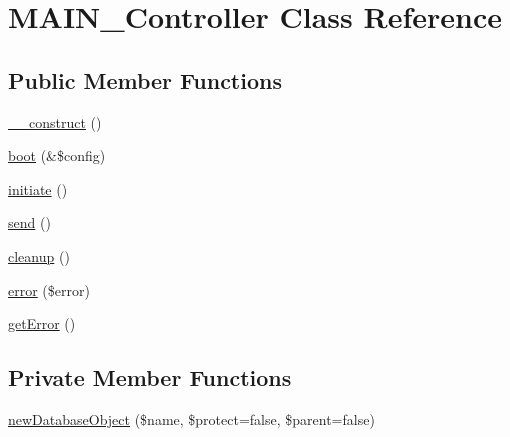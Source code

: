 \hypertarget{classMAIN__Controller}{
\section{MAIN\_\-Controller Class Reference}
\label{d0/d6f/classMAIN__Controller}
}
\subsection*{Public Member Functions}
\begin{DoxyCompactItemize}
\item 
\hyperlink{classMAIN__Controller_af1465bb574b9238d78d1b0172fb5249e}{\_\-\_\-construct} ()
\item 
\hyperlink{classMAIN__Controller_a5c77de67c4b47bcda0c997a5db3f32fa}{boot} (\&\$config)
\item 
\hyperlink{classMAIN__Controller_a63a01965c1673fbdbe5eb374ddf5c8d6}{initiate} ()
\item 
\hyperlink{classMAIN__Controller_a940555212e44afb717f9c11e9b6424d8}{send} ()
\item 
\hyperlink{classMAIN__Controller_a6400bbd98dfe782c6c54b46e035a92c1}{cleanup} ()
\item 
\hyperlink{classMAIN__Controller_a252a95de7cc347b94614c5ae4fbf3d06}{error} (\$error)
\item 
\hyperlink{classMAIN__Controller_a8d9ca0c2bdd69d2d18fa90de23acc2de}{getError} ()
\end{DoxyCompactItemize}
\subsection*{Private Member Functions}
\begin{DoxyCompactItemize}
\item 
\hyperlink{classMAIN__Controller_abdf41ec9c3425b16d70236e0fe497b9f}{newDatabaseObject} (\$name, \$protect=false, \$parent=false)
\end{DoxyCompactItemize}
